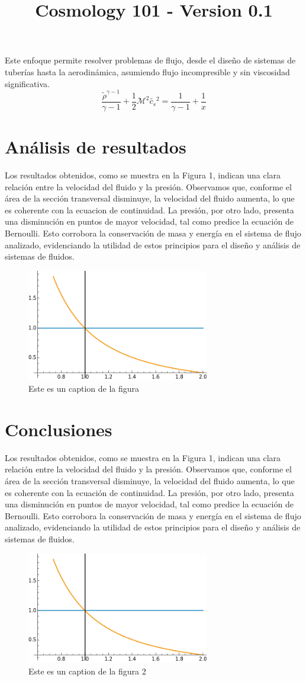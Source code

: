 \documentclass{article}\usepackage{graphicx} \usepackage{amsmath} \usepackage{colortbl}\title{Cosmology 101 - Version 0.1}
\begin{document}
Este enfoque permite resolver problemas de flujo, desde el diseño de sistemas de tuberías hasta la aerodinámica, asumiendo flujo incompresible y sin viscosidad significativa. \begin{equation}\frac{\tilde{\rho }^{\gamma -1}}{\gamma -1}+\frac{1}{2} \mathcal{M}^2 \tilde{c_s}{}^2=\frac{1}{\gamma -1}+\frac{1}{x} \label{ber2} \end{equation}\section{An{\'a}lisis de resultados}
Los resultados obtenidos, como se muestra en la Figura 1, indican una clara relación entre la velocidad del fluido y la presión. Observamos que, conforme el área de la sección transversal disminuye, la velocidad del fluido aumenta, lo que es coherente con la ecuacion de continuidad. La presión, por otro lado, presenta una disminución en puntos de mayor velocidad, tal como predice la ecuación de Bernoulli. Esto corrobora la conservación de masa y energía en el sistema de flujo analizado, evidenciando la utilidad de estos principios para el diseño y análisis de sistemas de fluidos.\begin{figure}\includegraphics[width=8.0cm]{images/imagen1.png}\caption{Este es un caption de la figura}\label{pl1}\end{figure}\section{Conclusiones}
Los resultados obtenidos, como se muestra en la Figura 1, indican una clara relación entre la velocidad del fluido y la presión. Observamos que, conforme el área de la sección transversal disminuye, la velocidad del fluido aumenta, lo que es coherente con la ecuación de continuidad. La presión, por otro lado, presenta una disminución en puntos de mayor velocidad, tal como predice la ecuación de Bernoulli. Esto corrobora la conservación de masa y energía en el sistema de flujo analizado, evidenciando la utilidad de estos principios para el diseño y análisis de sistemas de fluidos.\begin{figure}\includegraphics[width=8.0cm]{images/imagen1.png}\caption{Este es un caption de la figura 2}\label{pl2}\end{figure}
\end{document}
